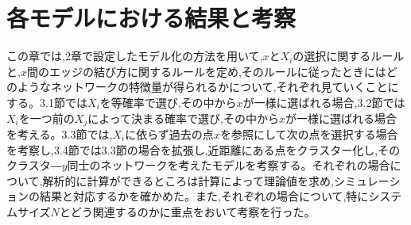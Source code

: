 \chapter{各モデルにおける結果と考察}

この章では,2章で設定したモデル化の方法を用いて,$x$と$X_{i}$の選択に関するルールと,$x$間のエッジの結び方に関するルールを定め,そのルールに従ったときにはどのようなネットワークの特徴量が得られるかについて,それぞれ見ていくことにする。3.1節では$X_{i}$を等確率で選び,その中から$x$が一様に選ばれる場合,3.2節では$X_{i}$を一つ前の$X_{j}$によって決まる確率で選び,その中から$x$が一様に選ばれる場合を考える。3.3節では,$X_{i}$に依らず過去の点$x$を参照にして次の点を選択する場合を考察し,3.4節では3.3節の場合を拡張し,近距離にある点をクラスター化し,そのクラスタ―$y$同士のネットワークを考えたモデルを考察する。それぞれの場合について,解析的に計算ができるところは計算によって理論値を求め,シミュレーションの結果と対応するかを確かめた。また,それぞれの場合について,特にシステムサイズ$N$とどう関連するのかに重点をおいて考察を行った。







